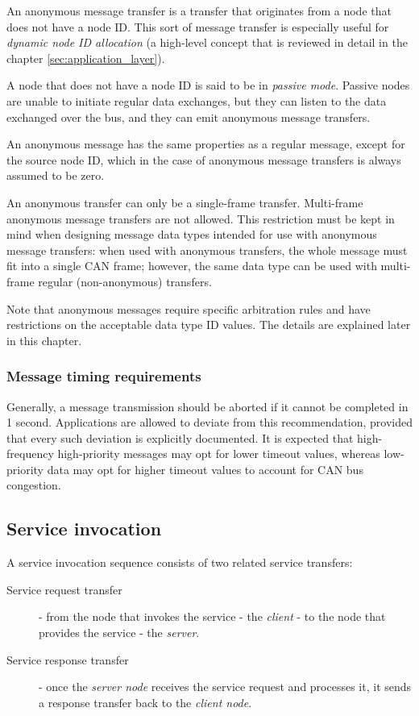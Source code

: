An anonymous message transfer is a transfer that originates from a node that does not have a node ID.
This sort of message transfer is especially useful for \emph{dynamic node ID allocation}
(a high-level concept that is reviewed in detail in the chapter \ref{sec:application_layer}).

A node that does not have a node ID is said to be in \emph{passive mode}.
Passive nodes are unable to initiate regular data exchanges,
but they can listen to the data exchanged over the bus,
and they can emit anonymous message transfers.

An anonymous message has the same properties as a regular message, except for the source node ID,
which in the case of anonymous message transfers is always assumed to be zero.

An anonymous transfer can only be a single-frame transfer. Multi-frame anonymous message transfers are not allowed.
This restriction must be kept in mind when designing message data types
intended for use with anonymous message transfers:
when used with anonymous transfers, the whole message must fit into a single CAN frame;
however, the same data type can be used with multi-frame regular (non-anonymous) transfers.

Note that anonymous messages require specific arbitration rules and have restrictions on the acceptable
data type ID values. The details are explained later in this chapter.

\subsubsection{Message timing requirements}

Generally, a message transmission should be aborted if it cannot be completed in 1 second.
Applications are allowed to deviate from this recommendation,
provided that every such deviation is explicitly documented.
It is expected that high-frequency high-priority messages may opt for lower timeout values,
whereas low-priority data may opt for higher timeout values to account for CAN bus congestion.

\subsection{Service invocation}

A service invocation sequence consists of two related service transfers:

\begin{description}
    \item[Service request transfer] - from the node that invokes the service - the \emph{client} - to the node that
    provides the service - the \emph{server}.

    \item[Service response transfer] - once the \emph{server node} receives the service request and processes it,
    it sends a response transfer back to the \emph{client node}.
\end{description}

